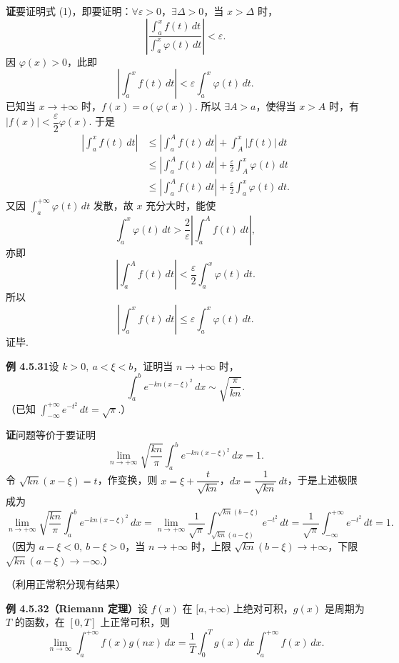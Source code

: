 \documentclass[UTF8, 12pt, fontset=fandol, oneside]{ctexart}
\begin{document}
\noindent\textbf{证}\quad 要证明式 (1)，即要证明：$\forall\varepsilon>0$，$\exists\Delta>0$，当 $x>\Delta$ 时，
\[
\left|\frac{\displaystyle\int_a^x f(t)\,dt}{\displaystyle\int_a^x\varphi(t)\,dt}\right|<\varepsilon.
\]
因 $\varphi(x)>0$，此即
\[
\left|\int_a^x f(t)\,dt\right|<\varepsilon\int_a^x\varphi(t)\,dt.
\]
已知当 $x\to+\infty$ 时，$f(x)=o(\varphi(x))$. 所以 $\exists A>a$，使得当 $x>A$ 时，有
$|f(x)|<\dfrac\varepsilon2\varphi(x)$. 于是
\begin{equation}
\begin{aligned}
\left|\int_a^x f(t)\,dt\right|
&\le\left|\int_a^A f(t)\,dt\right|+\int_A^x|f(t)|\,dt\\
&\le\left|\int_a^A f(t)\,dt\right|+\frac\varepsilon2\int_A^x\varphi(t)\,dt\\
&\le\left|\int_a^A f(t)\,dt\right|+\frac\varepsilon2\int_a^x\varphi(t)\,dt.
\end{aligned}
\tag{2}
\end{equation}
又因 $\displaystyle\int_a^{+\infty}\varphi(t)\,dt$ 发散，故 $x$ 充分大时，能使
\[
\int_a^x\varphi(t)\,dt>\frac2\varepsilon\left|\int_a^A f(t)\,dt\right|,
\]
亦即
\[
\left|\int_a^A f(t)\,dt\right|<\frac\varepsilon2\int_a^x\varphi(t)\,dt.
\]
所以
\[
\left|\int_a^x f(t)\,dt\right|\le\varepsilon\int_a^x\varphi(t)\,dt.
\]
证毕.

\noindent\textbf{例 4.5.31}\quad 设 $k>0,\ a<\xi<b$，证明当 $n\to+\infty$ 时，
\[
\int_a^b e^{-kn(x-\xi)^2}\,dx\sim\sqrt{\frac\pi{kn}}.
\]
（已知 $\displaystyle\int_{-\infty}^{+\infty}e^{-t^2}\,dt=\sqrt\pi$.）

\noindent\textbf{证}\quad 问题等价于要证明
\[
\lim_{n\to+\infty}\sqrt{\frac{kn}\pi}\int_a^b e^{-kn(x-\xi)^2}\,dx=1.
\]
令 $\sqrt{kn}(x-\xi)=t$，作变换，则 $x=\xi+\dfrac{t}{\sqrt{kn}}$，$dx=\dfrac1{\sqrt{kn}}\,dt$，于是上述极限成为
\[
\lim_{n\to+\infty}\sqrt{\frac{kn}\pi}\int_a^b e^{-kn(x-\xi)^2}\,dx
=\lim_{n\to+\infty}\frac1{\sqrt\pi}\int_{\sqrt{kn}(a-\xi)}^{\sqrt{kn}(b-\xi)}e^{-t^2}\,dt
=\frac1{\sqrt\pi}\int_{-\infty}^{+\infty}e^{-t^2}\,dt=1.
\]
（因为 $a-\xi<0,\ b-\xi>0$，当 $n\to+\infty$ 时，上限 $\sqrt{kn}(b-\xi)\to+\infty$，下限
$\sqrt{kn}(a-\xi)\to-\infty$.）

（利用正常积分现有结果）

\noindent\textbf{例 4.5.32（Riemann 定理）}\quad 设 $f(x)$ 在 $[a,+\infty)$ 上绝对可积，$g(x)$ 是周期为 $T$ 的函数，在 $[0,T]$ 上正常可积，则
\begin{equation}
\lim_{n\to\infty}\int_a^{+\infty}f(x)g(nx)\,dx
=\frac1T\int_0^T g(x)\,dx\int_a^{+\infty}f(x)\,dx. \tag{1}
\end{equation}
\end{document}
